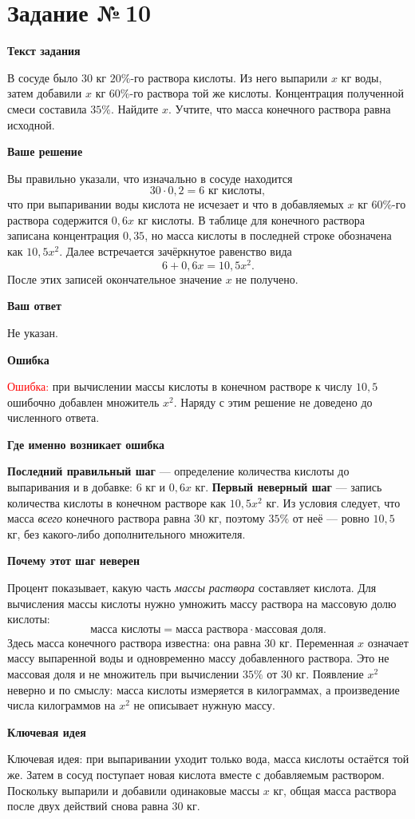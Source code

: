 \documentclass[12pt,a4paper]{article}
\newcommand{\problemheading}[1]{\section*{Задание №\,#1}}
\newcommand{\subblock}[1]{\vspace{4pt}\noindent\textbf{#1}\par}
\begin{document}
\newpage
{}\label{task:10}
\problemheading{10}
\subblock{Текст задания}
В сосуде было $30$ кг $20\%$-го раствора кислоты.
Из него выпарили $x$ кг воды, затем добавили $x$ кг $60\%$-го
раствора той же кислоты. Концентрация полученной смеси составила
$35\%$. Найдите $x$. Учтите, что масса конечного раствора
равна исходной.

\subblock{Ваше решение}
Вы правильно указали, что изначально в сосуде находится
\[
30\cdot0{,}2=6\text{ кг кислоты},
\]
что при выпаривании воды кислота не исчезает и что
в добавляемых $x$ кг $60\%$-го раствора содержится $0{,}6x$ кг кислоты.
В таблице для конечного раствора записана концентрация $0{,}35$,
но масса кислоты в последней строке обозначена как $10{,}5x^2$.
Далее встречается зачёркнутое равенство вида
\[
6+0{,}6x=10{,}5x^2.
\]
После этих записей окончательное значение $x$ не получено.

\subblock{Ваш ответ}
Не указан.

\subblock{Ошибка}
\textcolor{red}{Ошибка:} при вычислении массы кислоты в конечном
растворе к числу $10{,}5$ ошибочно добавлен множитель $x^2$.
Наряду с этим решение не доведено до численного ответа.

\subblock{Где именно возникает ошибка}
\textbf{Последний правильный шаг} --- определение количества кислоты
до выпаривания и в добавке: $6$ кг и $0{,}6x$ кг.
\textbf{Первый неверный шаг} --- запись количества кислоты
в конечном растворе как $10{,}5x^2$ кг.
Из условия следует, что масса \emph{всего} конечного раствора
равна $30$ кг, поэтому $35\%$ от неё --- ровно $10{,}5$ кг,
без какого-либо дополнительного множителя.

\subblock{Почему этот шаг неверен}
Процент показывает, какую часть \emph{массы раствора}
составляет кислота. Для вычисления массы кислоты нужно
умножить массу раствора на массовую долю кислоты:
\[
\text{масса кислоты}=
\text{масса раствора}\cdot\text{массовая доля}.
\]
Здесь масса конечного раствора известна: она равна $30$ кг.
Переменная $x$ означает массу выпаренной воды и одновременно
массу добавленного раствора. Это не массовая доля и не множитель
при вычислении $35\%$ от $30$ кг. Появление $x^2$ неверно
и по смыслу: масса кислоты измеряется в килограммах,
а произведение числа килограммов на $x^2$ не описывает
нужную массу.

\subblock{Ключевая идея}
\textcolor{blue!60!black}{Ключевая идея:} при выпаривании уходит
только вода, масса кислоты остаётся той же. Затем в сосуд
поступает новая кислота вместе с добавляемым раствором.
Поскольку выпарили и добавили одинаковые массы $x$ кг,
общая масса раствора после двух действий снова равна $30$ кг.
\end{document}

